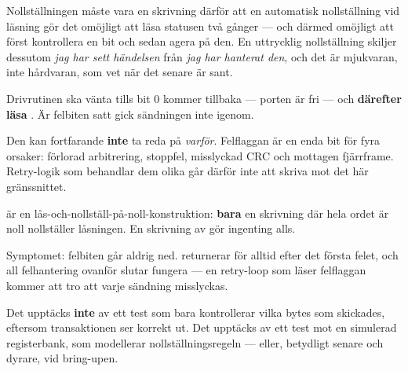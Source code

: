 Nollställningen måste vara en skrivning därför att en automatisk nollställning vid läsning gör det
omöjligt att läsa statusen två gånger --- och därmed omöjligt att först kontrollera en bit och
sedan agera på den. En uttrycklig nollställning skiljer dessutom \emph{jag har sett händelsen} från
\emph{jag har hanterat den}, och det är mjukvaran, inte hårdvaran, som vet när det senare är sant.

 Drivrutinen ska vänta tills  bit 0 kommer tillbaka --- porten är fri --- och
\textbf{därefter läsa }. Är felbiten satt gick sändningen inte igenom.

Den kan fortfarande \textbf{inte} ta reda på \emph{varför}. Felflaggan är en enda bit för fyra
orsaker: förlorad arbitrering, stoppfel, misslyckad CRC och mottagen fjärrframe. Retry-logik som
behandlar dem olika går därför inte att skriva mot det här gränssnittet.

  är en lås-och-nollställ-på-noll-konstruktion: \textbf{bara} en skrivning
där hela ordet är noll nollställer låsningen. En skrivning av  gör ingenting alls.

Symptomet: felbiten går aldrig ned.  returnerar  för alltid efter det
första felet, och all felhantering ovanför slutar fungera --- en retry-loop som läser felflaggan
kommer att tro att varje sändning misslyckas.

Det upptäcks \textbf{inte} av ett test som bara kontrollerar vilka bytes som skickades, eftersom
transaktionen ser korrekt ut. Det upptäcks av ett test mot en simulerad registerbank, som modellerar
nollställningsregeln --- eller, betydligt senare och dyrare, vid bring-upen.
